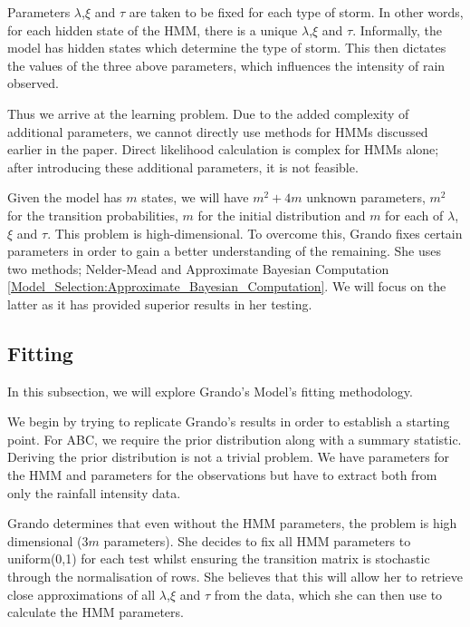     Parameters $\lambda$,$\xi$ and $\tau$ are taken to be fixed for each type of storm. In other words, for each hidden state of the HMM, there is a unique $\lambda$,$\xi$ and $\tau$. Informally, the model has hidden states which determine the type of storm. This then dictates the values of the three above parameters, which influences the intensity of rain observed.

    Thus we arrive at the learning problem. Due to the added complexity of additional parameters, we cannot directly use methods for HMMs discussed earlier in the paper. Direct likelihood calculation is complex for HMMs alone; after introducing these additional parameters, it is not feasible. 

    Given the model has $m$ states, we will have $m^2+4m$ unknown parameters, $m^2$ for the transition probabilities, $m$ for the initial distribution and $m$ for each of $\lambda$,$\xi$ and $\tau$.  This problem is high-dimensional. To overcome this, Grando fixes certain parameters in order to gain a better understanding of the remaining. She uses two methods; Nelder-Mead and Approximate Bayesian Computation \ref{Model_Selection:Approximate_Bayesian_Computation}. We will focus on the latter as it has provided superior results in her testing.

    \subsection{Fitting}
    \label{Replicating_Existing_Rainfall_Model:Grando:Fitting}

    In this subsection, we will explore Grando's Model's fitting methodology. 

    We begin by trying to replicate Grando's results in order to establish a starting point. For ABC, we require the prior distribution along with a summary statistic. Deriving the prior distribution is not a trivial problem. We have parameters for the HMM and parameters for the observations but have to extract both from only the rainfall intensity data. 

    Grando determines that even without the HMM parameters, the problem is high dimensional (3$m$ parameters). She decides to fix all HMM parameters to uniform(0,1) for each test whilst ensuring the transition matrix is stochastic through the normalisation of rows. She believes that this will allow her to retrieve close approximations of all $\lambda$,$\xi$ and $\tau$ from the data, which she can then use to calculate the HMM parameters. 


